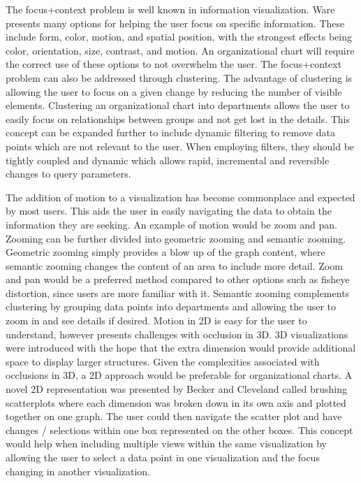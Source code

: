 \documentclass{soups}
\begin{document}
The focus+context problem is well known in information visualization.  Ware presents many options for helping the user focus on specific information.  These include form, color, motion, and spatial position, with the strongest effects being color, orientation, size, contrast, and motion\cite[chapter 5]{ware2012information}.  An organizational chart will require the correct use of these options to not overwhelm the user.  The focus+context problem can also be addressed through clustering.  The advantage of clustering is allowing the user to focus on a given change by reducing the number of visible elements\cite{herman2000graph}.  Clustering an organizational chart into departments allows the user to easily focus on relationships between groups and not get lost in the details.  This concept can be expanded further to include dynamic filtering to remove data points which are not relevant to the user.  When employing filters, they should be tightly coupled and dynamic which allows rapid, incremental and reversible changes to query parameters\cite{ahlberg1994visual}.

The addition of motion to a visualization has become commonplace and expected by most users.  This aids the user in easily navigating the data to obtain the information they are seeking.  An example of motion would be zoom and pan.  Zooming can be further divided into geometric zooming and semantic zooming.  Geometric zooming simply provides a blow up of the graph content, where semantic zooming changes the content of an area to include more detail\cite{herman2000graph}.  Zoom and pan would be a preferred method compared to other options such as fisheye distortion, since users are more familiar with it.  Semantic zooming complements clustering by grouping data points into departments and allowing the user to zoom in and see details if desired.  Motion in 2D is easy for the user to understand, however presents challenges with occlusion in 3D.  3D visualizations were introduced with the hope that the extra dimension would provide additional space to display larger structures\cite{herman2000graph}.  Given the complexities associated with occlusions in 3D, a 2D approach would be preferable for organizational charts.  A novel 2D representation was presented by Becker and Cleveland called brushing scatterplots where each dimension was broken down in its own axis and plotted together on one graph\cite{becker1987brushing}.  The user could then navigate the scatter plot and have changes / selections within one box represented on the other boxes.  This concept would help when including multiple views within the same visualization by allowing the user to select a data point in one visualization and the focus changing in another visualization.
\end{document}
